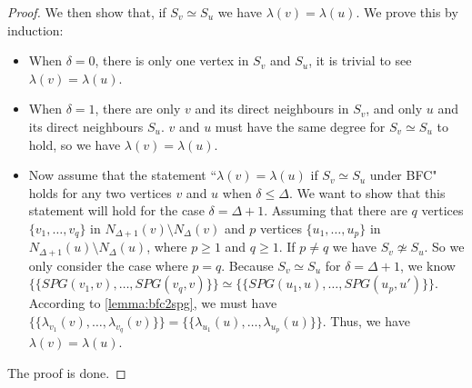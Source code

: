 \begin{proof}
We then show that, if $S_v\simeq S_u$ we have $\lambda(v)=\lambda(u)$.
We prove this by induction:
\begin{itemize}
    \item When $\delta=0$, there is only one vertex in $S_v$ and $S_u$, it is trivial to see $\lambda(v)=\lambda(u)$.
    \item When $\delta=1$, there are only $v$ and its direct neighbours in $S_v$, and only $u$ and its direct neighbours $S_u$. $v$ and $u$ must have the same degree for $S_v\simeq S_u$ to hold, so we have $\lambda(v)=\lambda(u)$.
    \item Now assume that the statement ``$\lambda(v)= \lambda(u)$ if $S_v\simeq S_u$ under BFC" holds for any two vertices $v$ and $u$ when $\delta\leq \Delta$. We want to show that this statement will hold for the case $\delta= \Delta+1$. 
    Assuming that there are $q$ vertices $\{v_1, \dots, v_q\}$ in $N_{\Delta+1}(v)\setminus N_{\Delta}(v)$ and $p$ vertices $\{u_1, \dots, u_p\}$ in $N_{\Delta+1}(u)\setminus N_{\Delta}(u)$, where $p\geq 1$ and $q\geq 1$. If $p \neq q$ we have $S_v\not\simeq S_u$. 
    So we only consider the case where $p=q$. 
    Because $S_v\simeq S_u$ for $\delta=\Delta+1$,
    we know $\{\!\!\{SPG(v_1,v),\dots, SPG(v_q,v)\}\!\!\} \simeq \{\!\!\{SPG(u_1,u),\dots, SPG(u_p,u')\}\!\!\}$. According to \cref{lemma:bfc2spg}, we must have $\{\!\!\{\lambda_{v_1}(v),\dots, \lambda_{v_q}(v)\}\!\!\} = \{\!\!\{\lambda_{u_1}(u),\dots, \lambda_{u_p}(u)\}\!\!\}$. Thus, we have $\lambda(v)= \lambda(u)$.
\end{itemize}
The proof is done.
\end{proof}




